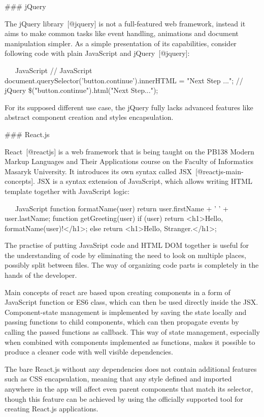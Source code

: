 \documentclass[
  digital, %
  oneside, %
  lof,     %
  lot,     %
]{fithesis4}
\begin{document}
{### jQuery

The jQuery library~[@jquery] is not a full-featured web framework, instead it aims to make common tasks like event handling, animations and document manipulation simpler. As a simple presentation of its capabilities, consider following code with plain JavaScript and jQuery~[@jquery]:

~~~JavaScript
// JavaScript
document.querySelector('button.continue').innerHTML = "Next Step ...";
// jQuery
\$("button.continue").html("Next Step...");
~~~

For its supposed different use case, the jQuery fully lacks advanced features like abstract component creation and styles encapsulation.

### React.js

React~[@reactjs] is a web framework that is being taught on the PB138 Modern Markup Languages and Their Applications course on the Faculty of Informatics Masaryk University. It introduces its own syntax called JSX~[@reactjs-main-concepts]. JSX is a syntax extension of JavaScript, which allows writing HTML template together with JavaScript logic:

~~~JavaScript
function formatName(user) {
  return user.firstName + ' ' + user.lastName;
}
function getGreeting(user) {
  if (user) return <h1>Hello, {formatName(user)}!</h1>;
  else return <h1>Hello, Stranger.</h1>;
}
~~~

The practise of putting JavaSript code and HTML DOM together is useful for the understanding of code by eliminating the need to look on multiple places, possibly split between files. The way of organizing code parts is completely in the hands of the developer.

Main concepts of react are based upon creating components in a form of JavaScript function or ES6 class, which can then be used directly inside the JSX. Component-state management is implemented by saving the state locally and passing functions to child components, which can then propagate events by calling the passed functions as callback. This way of state management, especially when combined with components implemented as functions, makes it possible to produce a cleaner code with well visible dependencies.

The bare React.js without any dependencies does not contain additional features such as CSS encapsulation, meaning that any style defined and imported anywhere in the app will affect even parent components that match its selector, though this feature can be achieved by using the officially supported tool for creating React.js applications.

}
\end{document}

